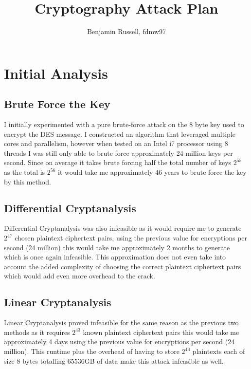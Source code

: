 \documentclass[11pt,a4paper]{article}
\title{Cryptography Attack Plan}
\author{Benjamin Russell, fdmw97}
\begin{document}
\maketitle

\section*{Initial Analysis}
\subsection*{Brute Force the Key}
I initially experimented with a pure brute-force attack on the 8 byte key used to encrypt the DES message. I constructed an algorithm that leveraged multiple cores and parallelism, however when tested on an Intel i7 processor using 8 threads I was still only able to brute force approximately 24 million keys per second. Since on average it takes brute forcing half the total number of keys $2^{55}$ as the total is $2^{56}$ it would take me approximately 46 years to brute force the key by this method.
\subsection*{Differential Cryptanalysis}
Differential Cryptanalysis was also infeasible as it would require me to generate $2^{47}$ chosen plaintext ciphertext pairs, using the previous value for encryptions per second (24 million) this would take me approximately 2 months to generate which is once again infeasible. This approximation does not even take into account the added complexity of choosing the correct plaintext ciphertext pairs which would add even more overhead to the crack.
\subsection*{Linear Cryptanalysis}
Linear Cryptanalysis proved infeasible for the same reason as the previous two methods as it requires $2^{43}$ known plaintext ciphertext pairs this would take me approximately 4 days using the previous value for encryptions per second (24 million). This runtime plus the overhead of having to store $2^{43}$ plaintexts each of size 8 bytes totalling 65536GB of data make this attack infeasible as well.
\end{document}
